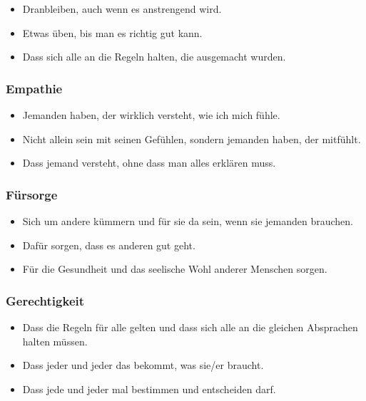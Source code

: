 \begin{itemize}
    \item Dranbleiben, auch wenn es anstrengend wird.
    \item Etwas üben, bis man es richtig gut kann.
    \item Dass sich alle an die Regeln halten, die ausgemacht wurden.
\end{itemize}

\subsubsection{Empathie}

\begin{itemize}
    \item Jemanden haben, der wirklich versteht, wie ich mich fühle.
    \item Nicht allein sein mit seinen Gefühlen, sondern jemanden haben, der mitfühlt.
    \item Dass jemand versteht, ohne dass man alles erklären muss.
\end{itemize}

\subsubsection{Fürsorge}

\begin{itemize}
    \item Sich um andere kümmern und für sie da sein, wenn sie jemanden brauchen.
    \item Dafür sorgen, dass es anderen gut geht.
    \item Für die Gesundheit und das seelische Wohl anderer Menschen sorgen.
\end{itemize}

\subsubsection{Gerechtigkeit}

\begin{itemize}
    \item Dass die Regeln für alle gelten und dass sich alle an die gleichen Absprachen halten müssen.
    \item Dass jeder und jeder das bekommt, was sie/er braucht.
    \item Dass jede und jeder mal bestimmen und entscheiden darf.
\end{itemize}

